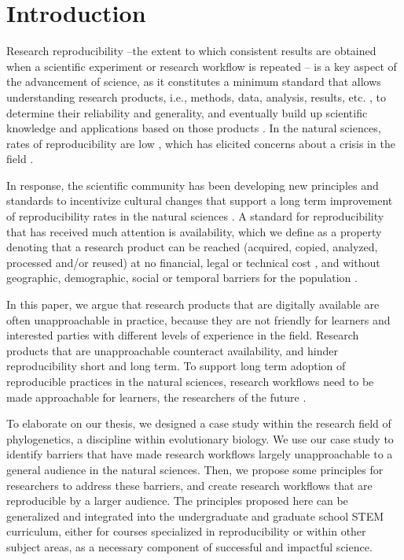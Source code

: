 \documentclass[12pt]{article}
\begin{document}
\newpage
{} %
\section*{Introduction}
\label{sec:intro}

Research reproducibility --the extent to which consistent results are obtained when
a scientific experiment or research workflow is repeated \citep{repdef2021}--
is a key aspect of the advancement
of science, as it constitutes a minimum standard that allows understanding research products,
i.e., methods, data, analysis, results, etc. \citep{piwowar2013value},
to determine their reliability and generality, and eventually build up scientific
knowledge and applications based on those products
\citep{king1995replication, peng2011reproducible, powers2019open}.
In the natural sciences, rates of reproducibility are low \citep{ioannidis2005most, prinz2011believe},
which has elicited concerns about a crisis in the field \citep{baker2016reproducibility}.

In response, the scientific community has been developing new principles and standards to incentivize
cultural changes that support a long term improvement of reproducibility rates in the natural sciences
\citep{peng2015reproducibility, wilkinson2016fair, miyakawa2020no}.
A standard for reproducibility that has received much attention is availability, which
we define as a property denoting that a research product can be reached (acquired, copied, analyzed,
processed and/or reused) at no financial, legal or technical cost \citep{arnold2019turing},
and without geographic, demographic, social or temporal barriers for the population \citep{fecher2014open}.

In this paper, we argue that research products that are digitally available are
often unapproachable in practice, because they are not
friendly for learners and interested parties with different levels of
experience in the field. Research products that are unapproachable
counteract availability, and hinder reproducibility short and long term.
To support long term adoption of reproducible practices in the natural sciences, research
workflows need to be made approachable for learners, the researchers of the future \citep{roland2002think}.

To elaborate on our thesis, we designed a case study within the research field of
phylogenetics, a discipline within evolutionary biology.
We use our case study to identify barriers that have made research workflows
largely unapproachable to a general audience in the natural sciences.
Then, we propose some principles for researchers to address these barriers, and
create research workflows that are reproducible by a larger audience.
The principles proposed here can be generalized and integrated into the undergraduate
and graduate school STEM curriculum, either for courses specialized in reproducibility
or within other subject areas, as a necessary component of successful and impactful science.
\end{document}
